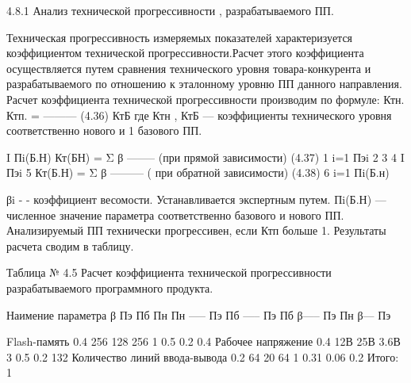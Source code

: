 \begin{ESKDexplanation}
\begin{ESKDexplanation}
\begin{ESKDexplanation}
\begin{ESKDexplanation}
  4.8.1        Анализ технической  прогрессивности , разрабатываемого ПП. 
 
Техническая прогрессивность  измеряемых показателей  характеризуется
коэффициентом технической прогрессивности.Расчет этого коэффициента 
осуществляется путем сравнения  технического уровня  товара-конкурента
и разрабатываемого по отношению к эталонному уровню  ПП  данного                                                                                                                            
 направления.
Расчет коэффициента технической прогрессивности производим по формуле:
                                            Ктн.
                             Ктп. = ---------                                                                           (4.36)
                                            КтБ
где Ктн , КтБ — коэффициенты технического уровня соответственно нового и                                                                                                 
	1	базового ПП.


                 I       Пi(Б.Н)
Кт(БН) =  Σ  β   --------                            (при прямой зависимости)                  (4.37)
	1	                        i=1          Пэi  
	2	
	3	
	4	                     I                 Пэi                       
	5	Кт(Б.Н) =    Σ  β ---------                           ( при обратной зависимости)              (4.38)
	6	               i=1       Пi(Б.н)

βi - - коэффициент весомости. Устанавливается экспертным путем.
Пi(Б.Н) — численное значение параметра соответственно базового
и нового ПП.
Анализируемый ПП технически прогрессивен, если Ктп больше   1.
Результаты расчета сводим в таблицу.





                                                                                                                Таблица № 4.5    Расчет коэффициента технической прогрессивности   
разрабатываемого программного продукта. 
      
 
Наимение параметра
β
 Пэ  
 Пб 
  Пн 
      Пн                           
     -----                 
      Пэ  
      Пб                           
     -----                 
      Пэ  
       Пб                           
     β-----                 
       Пэ 
       Пн                          
     β---                 
       Пэ                                    
                 
Flash-память
0.4
256
128
256
1
0.5
0.2
0.4
Рабочее напряжение
0.4
12В
25В
3.6В
3
0.5
0.2
132
Количество линий ввода-вывода
0.2
64
20
64
1
0.31
0.06
0.2
Итого:
1






\end{ESKDexplanation}
\end{ESKDexplanation}
\end{ESKDexplanation}
\end{ESKDexplanation}
